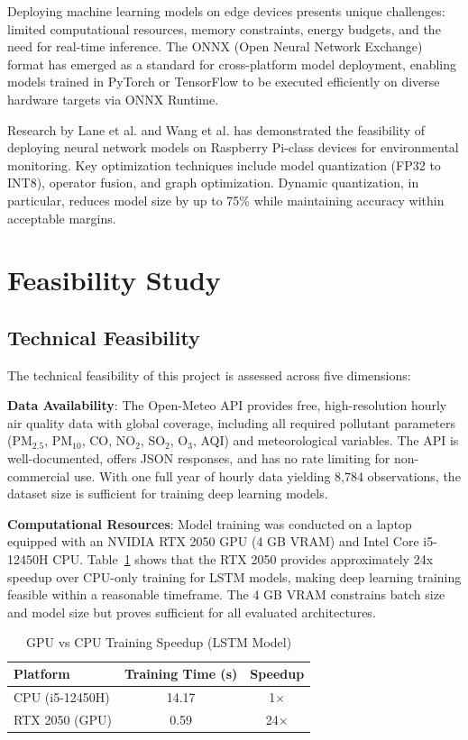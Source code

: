 Deploying machine learning models on edge devices presents unique challenges: limited computational resources, memory constraints, energy budgets, and the need for real-time inference. The ONNX (Open Neural Network Exchange) format has emerged as a standard for cross-platform model deployment, enabling models trained in PyTorch or TensorFlow to be executed efficiently on diverse hardware targets via ONNX Runtime.

Research by Lane et al. and Wang et al. has demonstrated the feasibility of deploying neural network models on Raspberry Pi-class devices for environmental monitoring. Key optimization techniques include model quantization (FP32 to INT8), operator fusion, and graph optimization. Dynamic quantization, in particular, reduces model size by up to 75\% while maintaining accuracy within acceptable margins.

\section{Feasibility Study}

\subsection{Technical Feasibility}

The technical feasibility of this project is assessed across five dimensions:

\textbf{Data Availability}: The Open-Meteo API provides free, high-resolution hourly air quality data with global coverage, including all required pollutant parameters (PM$_{2.5}$, PM$_{10}$, CO, NO$_2$, SO$_2$, O$_3$, AQI) and meteorological variables. The API is well-documented, offers JSON responses, and has no rate limiting for non-commercial use. With one full year of hourly data yielding 8,784 observations, the dataset size is sufficient for training deep learning models.

\textbf{Computational Resources}: Model training was conducted on a laptop equipped with an NVIDIA RTX 2050 GPU (4 GB VRAM) and Intel Core i5-12450H CPU. Table~\ref{tab:gpu_speedup} shows that the RTX 2050 provides approximately 24x speedup over CPU-only training for LSTM models, making deep learning training feasible within a reasonable timeframe. The 4 GB VRAM constrains batch size and model size but proves sufficient for all evaluated architectures.

\begin{table}[H]
\centering
\caption{GPU vs CPU Training Speedup (LSTM Model)}
\label{tab:gpu_speedup}
\begin{tabular}{lcc}
\toprule
\textbf{Platform} & \textbf{Training Time (s)} & \textbf{Speedup} \\
\midrule
CPU (i5-12450H) & 14.17 & 1$\times$ \\
RTX 2050 (GPU) & 0.59 & 24$\times$ \\
\bottomrule
\end{tabular}
\end{table}

